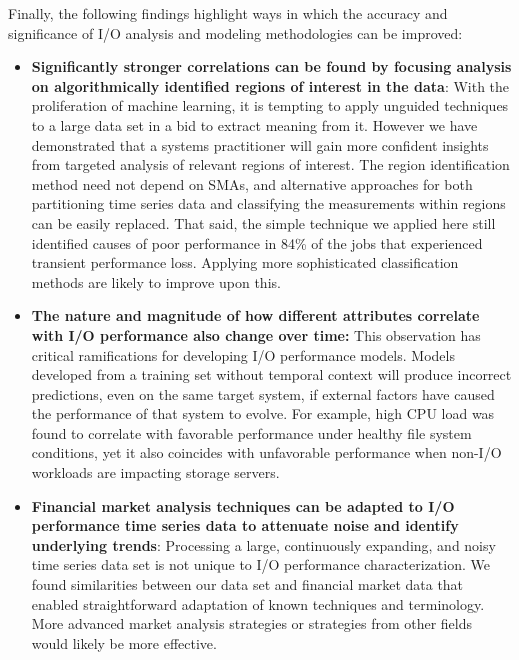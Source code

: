 Finally, the following findings highlight ways in which the accuracy and significance of I/O analysis and modeling methodologies can be improved:

\begin{itemize}[leftmargin=*]

\item \textbf{Significantly stronger correlations can be found by focusing analysis on algorithmically identified regions of interest in the data}:
With the proliferation of machine learning, it is tempting to apply unguided techniques to a large data set in a bid to extract meaning from it.
However we have demonstrated that a systems practitioner will gain more confident insights from targeted analysis of relevant regions of interest.
The region identification method need not depend on SMAs, and alternative approaches for both partitioning time series data and classifying the measurements within regions can be easily replaced.
That said, the simple technique we applied here still identified causes of poor performance in 84\% of the jobs that experienced transient performance loss.
Applying more sophisticated classification methods are likely to improve upon this.


\item \textbf{The nature and magnitude of how different attributes correlate with I/O performance also change over time:}
This observation has critical ramifications for developing I/O performance models.
Models developed from a training set without temporal context will produce incorrect predictions, even on the same target system, if
external factors have caused the performance of that system to evolve.
For example, high CPU load was found to correlate with favorable performance under healthy file system conditions, yet it also coincides with unfavorable performance when non-I/O workloads are impacting storage servers.

\item \textbf{Financial market analysis techniques can be adapted to I/O performance time series data to attenuate noise and identify underlying trends}:
Processing a large, continuously expanding, and noisy time series data set is not unique to I/O performance characterization.
We found similarities between our data set and financial market data that enabled straightforward adaptation of known techniques and terminology.
More advanced market analysis strategies or strategies from other fields would likely be more effective.

\end{itemize}

